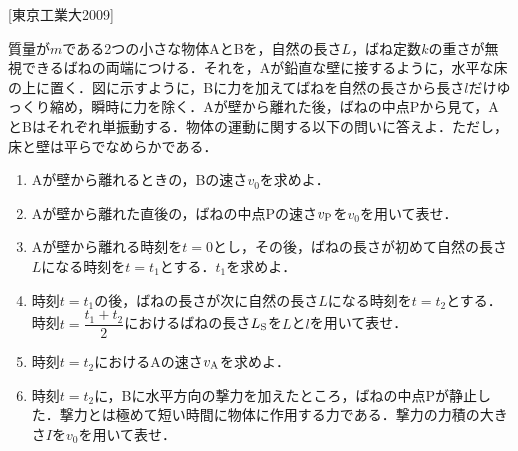 


\noindent
{} [東京工業大2009]

質量が$m$である2つの小さな物体AとBを，自然の長さ$L$，ばね定数$k$の重さが無視できるばねの両端につける．それを，Aが鉛直な壁に接するように，水平な床の上に置く．図に示すように，Bに力を加えてばねを自然の長さから長さ$l$だけゆっくり縮め，瞬時に力を除く．Aが壁から離れた後，ばねの中点Pから見て，AとBはそれぞれ単振動する．物体の運動に関する以下の問いに答えよ．ただし，床と壁は平らでなめらかである．
\begin{enumerate}[label=\textbf{問\arabic*}]
  \item {\hzw}Aが壁から離れるときの，Bの速さ$v_0$を求めよ．
  \item {\hzw}Aが壁から離れた直後の，ばねの中点Pの速さ$v_\mathrm{P}$を$v_0$を用いて表せ．
  \item {\hzw}Aが壁から離れる時刻を$t = 0$とし，その後，ばねの長さが初めて自然の長さ$L$になる時刻を$t = t_1$とする．$t_1$を求めよ．
  \item {\hzw}時刻$t = t_1$の後，ばねの長さが次に自然の長さ$L$になる時刻を$t = t_2$とする．時刻$t = \dfrac{t_1 + t_2}{2}$におけるばねの長さ$L_\mathrm{S}$を$L$と$l$を用いて表せ．
  \item {\hzw}時刻$t=t_2$におけるAの速さ$v_\mathrm{A}$を求めよ．
  \item {\hzw}時刻$t = t_2$に，Bに水平方向の撃力を加えたところ，ばねの中点Pが静止した．撃力とは極めて短い時間に物体に作用する力である．撃力の力積の大きさ$I$を$v_0$を用いて表せ．
\end{enumerate}
